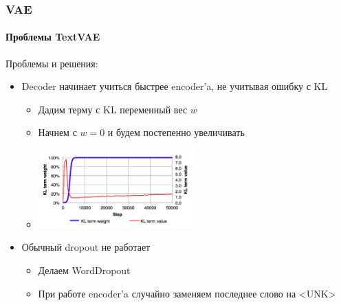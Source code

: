 \documentclass[10pt]{beamer}
\begin{document}
\begin{frame}
\frametitle{VAE}
\framesubtitle{Проблемы TextVAE}

Проблемы и решения:
\begin{itemize}
    \item Decoder начинает учиться быстрее encoder'a, не учитывая ошибку с KL
    \begin{itemize}
        \item Дадим терму с KL переменный вес $w$
        \item Начнем с $w = 0$ и будем постепенно увеличивать
        \item \includegraphics[width=0.5\textwidth]{images/kl_term_w.png}
    \end{itemize}
    \item Обычный dropout не работает
    \begin{itemize}
        \item Делаем WordDropout
        \item При работе encoder'a случайно заменяем последнее слово на <UNK>
    \end{itemize}
\end{itemize}

\end{frame}
\end{document}
